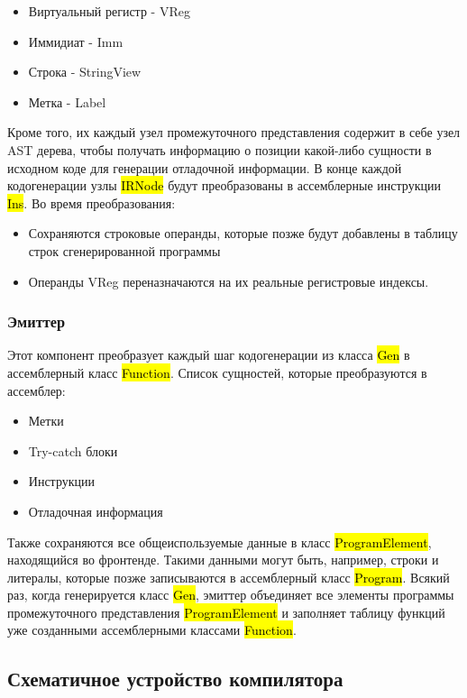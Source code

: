\begin{itemize}[left=2em]
    \item Виртуальный регистр - VReg
    \item Иммидиат - Imm
    \item Строка - StringView
    \item Метка - Label
\end{itemize}

Кроме того, их каждый узел промежуточного представления содержит в себе узел AST дерева,
чтобы получать информацию о позиции какой-либо сущности в исходном коде для генерации отладочной информации.
В конце каждой кодогенерации узлы \hl{IRNode} будут преобразованы в ассемблерные инструкции \hl{Ins}.
Во время преобразования:

\begin{itemize}[left=2em]
    \item Сохраняются строковые операнды, которые позже будут добавлены в таблицу строк сгенерированной программы
    \item Операнды VReg переназначаются на их реальные регистровые индексы.
\end{itemize}

\subsubsection{Эмиттер}

Этот компонент преобразует каждый шаг кодогенерации из класса \hl{Gen} в ассемблерный класс \hl{Function}.
Список сущностей, которые преобразуются в ассемблер:

\begin{itemize}[left=2em]
    \item Метки
    \item Try-catch блоки
    \item Инструкции
    \item Отладочная информация
\end{itemize}

Также сохраняются все общеиспользуемые данные в класс \hl{ProgramElement}, находящийся во фронтенде.
Такими данными могут быть, например, строки и литералы, которые позже записываются в ассемблерный класс \hl{Program}.
Всякий раз, когда генерируется класс \hl{Gen}, эмиттер объединяет все элементы программы промежуточного представления
\hl{ProgramElement} и заполняет таблицу функций уже созданными ассемблерными классами \hl{Function}.

\subsection{Схематичное устройство компилятора}

